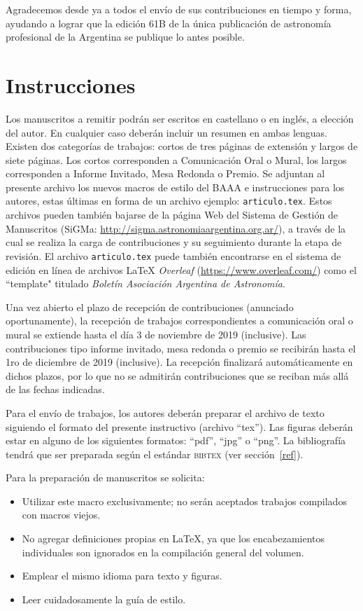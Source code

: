 \documentclass[baaa]{baaa}
\begin{document}
Agradecemos desde ya a todos el envío de sus contribuciones en tiempo y forma, ayudando a lograr que la edición 61B de la única publicación de astronomía profesional de la Argentina se publique lo antes posible.

\section{Instrucciones}

Los manuscritos a remitir podrán ser escritos en cas\-te\-lla\-no o en inglés, a elección del autor. En cualquier caso deberán incluir un resumen en ambas lenguas. Existen dos categorías de trabajos: cortos de tres páginas de extensión y largos de siete páginas. Los cortos corresponden a Comunicación Oral o Mural, los largos co\-rres\-pon\-den a Informe Invitado, Mesa Redonda o Premio. Se adjuntan al presente archivo los nuevos macros de estilo del BAAA e instrucciones para los autores, estas últimas en forma de un archivo ejemplo: {\tt articulo.tex}. Estos archivos pueden también bajarse de la página Web del Sistema de Gestión de Manuscritos  (SiGMa: \url{http://sigma.astronomiaargentina.org.ar/}), a través de la cual se realiza la carga de contribuciones y su seguimiento durante la etapa de revisión. El archivo {\tt articulo.tex} puede también encontrarse en el sistema de edición en línea de archivos \LaTeX{} \emph{Overleaf} (\url{https://www.overleaf.com/}) como el ``template" ti\-tu\-la\-do \emph{Boletín Asociación Argentina de Astronomía}.

Una vez abierto el plazo de recepción de contribuciones (anunciado oportunamente), la recepción de trabajos correspondientes a comunicación oral o mural se extiende hasta el día 3 de noviembre de 2019 (inclusive). Las contribuciones tipo informe invitado, mesa redonda o premio se recibirán hasta el 1ro de diciembre de 2019 (inclusive). La recepción finalizará automáticamente en dichos plazos, por lo que no se admitirán contribuciones que se reciban más allá de las fechas indicadas.

Para el envío de trabajos, los autores deberán preparar el archivo de texto siguiendo
el formato del presente instructivo (archivo ``tex'').  Las figuras deberán estar en alguno de los siguientes formatos: ``pdf'', ``jpg'' o ``png''. La bibliografía tendrá que ser preparada según el estándar \textsc{bibtex}  (ver sección~\ref{ref}).

Para la preparación de manuscritos se solicita: 

\begin{itemize}
   \item Utilizar este macro exclusivamente; no serán aceptados trabajos compilados con macros viejos.
   \item No agregar definiciones propias en \LaTeX{}, ya que los encabezamientos individuales son ignorados en la compilación general del volumen.
   \item Emplear el mismo idioma para texto y figuras.
   \item Leer cuidadosamente la guía de estilo. 
\end{itemize}
\end{document}

